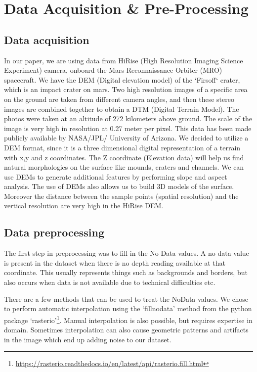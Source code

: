 \documentclass[sigconf,natbib=false]{acmart}
\begin{document}
\section{Data Acquisition \& Pre-Processing}
\subsection{Data acquisition}
 In our paper, we are using data from HiRise (High Resolution Imaging Science Experiment) camera, onboard the Mars Reconnaissance Orbiter (MRO) spacecraft. We have the DEM (Digital elevation model) of the ‘Firsoff‘ crater, which is an impact crater on mars. Two high resolution images of a specific area on the ground are taken from different camera angles, and then these stereo images are combined together to obtain a DTM (Digital Terrain Model). The photos were taken at an altitude of 272 kilometers above ground. The scale of the image is very high in resolution at 0.27 meter per pixel. This data has been made publicly available by NASA/JPL/ University of Arizona. 
 We decided to utilize a DEM format, since it is a three dimensional digital representation of a terrain with x,y and z coordinates. The Z coordinate (Elevation data) will help us find natural morphologies on the surface like mounds, craters and channels. We can use DEMs to generate additional features by performing slope and aspect analysis. The use of DEMs also allows us to build 3D models of the surface. Moreover the distance between the sample points (spatial resolution) and the vertical resolution are very high in the HiRise DEM.

\subsection{Data preprocessing}
The first step in preprocessing was to fill in the No Data values. A no data value is present in the dataset when there is no depth reading available at that coordinate. This usually represents things such as backgrounds and borders, but also occurs when data is not available due to technical difficulties etc. 

There are a few methods that can be used to treat the NoData values. We chose to perform automatic interpolation using the ‘fillnodata’ method from the python package ‘rasterio’\footnote{\url{https://rasterio.readthedocs.io/en/latest/api/rasterio.fill.html}}. Manual interpolation is also possible, but requires expertise in domain. Sometimes interpolation can also cause geometric patterns and artifacts in the image which end up adding noise to our dataset.
\end{document}
